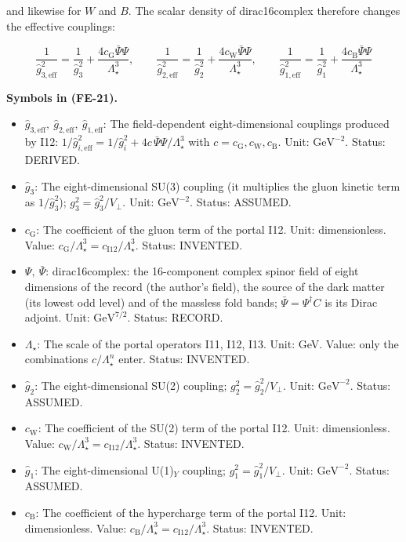 \documentclass[
  10pt,
]{article}
\providecommand{\tightlist}{%
  \setlength{\itemsep}{0pt}\setlength{\parskip}{0pt}}
\begin{document}
and likewise for \(W\) and \(B\). The scalar density of dirac16complex
therefore changes the effective couplings:

\[
\frac{1}{\hat g_{3,\mathrm{eff}}^2} = \frac{1}{\hat g_3^2} +
 \frac{4c_{\mathrm{G}}\bar\Psi\Psi}{\Lambda_\star^3},\qquad
\frac{1}{\hat g_{2,\mathrm{eff}}^2} = \frac{1}{\hat g_2^2} +
 \frac{4c_{\mathrm{W}}\bar\Psi\Psi}{\Lambda_\star^3},\qquad
\frac{1}{\hat g_{1,\mathrm{eff}}^2} = \frac{1}{\hat g_1^2} +
 \frac{4c_{\mathrm{B}}\bar\Psi\Psi}{\Lambda_\star^3} \tag{FE-21}
\]

\textbf{Symbols in (FE-21).}

\begin{itemize}
\tightlist
\item
  \(\hat g_{3,\mathrm{eff}},\ \hat g_{2,\mathrm{eff}},\ \hat g_{1,\mathrm{eff}}\):
  The field-dependent eight-dimensional couplings produced by I12:
  \(1/\hat g_{i,\mathrm{eff}}^2 = 1/\hat g_i^2 + 4c\,\bar\Psi\Psi/\Lambda_\star^3\)
  with \(c = c_{\mathrm{G}}, c_{\mathrm{W}}, c_{\mathrm{B}}\). Unit:
  \(\mathrm{GeV}^{-2}\). Status: DERIVED.
\item
  \(\hat g_3\): The eight-dimensional SU(3) coupling (it multiplies the
  gluon kinetic term as \(1/\hat g_3^2\));
  \(g_3^2 = \hat g_3^2/V_\perp\). Unit: \(\mathrm{GeV}^{-2}\). Status:
  ASSUMED.
\item
  \(c_{\mathrm{G}}\): The coefficient of the gluon term of the portal
  I12. Unit: dimensionless. Value:
  \(c_{\mathrm{G}}/\Lambda_\star^3 = c_{\mathrm{I12}}/\Lambda_\star^3\).
  Status: INVENTED.
\item
  \(\Psi,\ \bar\Psi\): dirac16complex: the 16-component complex spinor
  field of eight dimensions of the record (the author's field), the
  source of the dark matter (its lowest odd level) and of the massless
  fold bands; \(\bar\Psi = \Psi^\dagger C\) is its Dirac adjoint. Unit:
  \(\mathrm{GeV}^{7/2}\). Status: RECORD.
\item
  \(\Lambda_\star\): The scale of the portal operators I11, I12, I13.
  Unit: GeV. Value: only the combinations \(c/\Lambda_\star^n\) enter.
  Status: INVENTED.
\item
  \(\hat g_2\): The eight-dimensional SU(2) coupling;
  \(g_2^2 = \hat g_2^2/V_\perp\). Unit: \(\mathrm{GeV}^{-2}\). Status:
  ASSUMED.
\item
  \(c_{\mathrm{W}}\): The coefficient of the SU(2) term of the portal
  I12. Unit: dimensionless. Value:
  \(c_{\mathrm{W}}/\Lambda_\star^3 = c_{\mathrm{I12}}/\Lambda_\star^3\).
  Status: INVENTED.
\item
  \(\hat g_1\): The eight-dimensional U(1)\(_Y\) coupling;
  \(g_1^2 = \hat g_1^2/V_\perp\). Unit: \(\mathrm{GeV}^{-2}\). Status:
  ASSUMED.
\item
  \(c_{\mathrm{B}}\): The coefficient of the hypercharge term of the
  portal I12. Unit: dimensionless. Value:
  \(c_{\mathrm{B}}/\Lambda_\star^3 = c_{\mathrm{I12}}/\Lambda_\star^3\).
  Status: INVENTED.
\end{itemize}
\end{document}

